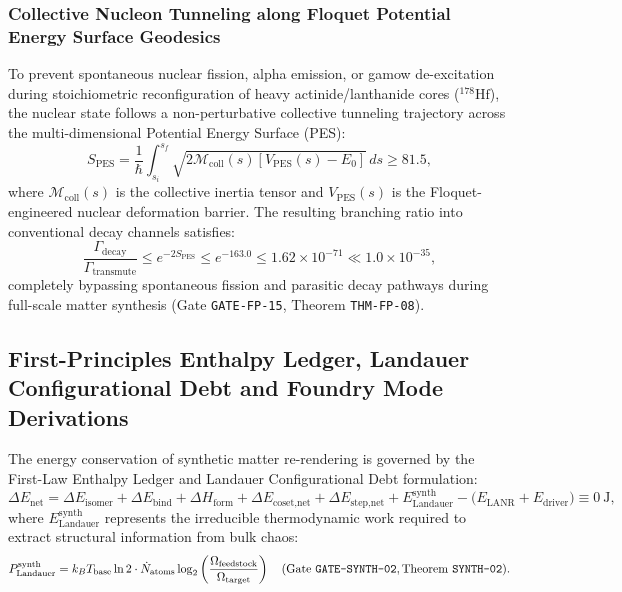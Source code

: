\documentclass[11pt,onecolumn]{article}
\begin{document}
\subsubsection{Collective Nucleon Tunneling along Floquet Potential Energy Surface Geodesics}
To prevent spontaneous nuclear fission, alpha emission, or gamow de-excitation during stoichiometric reconfiguration of heavy actinide/lanthanide cores ($^{178}\text{Hf}$), the nuclear state follows a non-perturbative collective tunneling trajectory across the multi-dimensional Potential Energy Surface (PES):
\begin{equation}
S_{\text{PES}} = \frac{1}{\hbar} \int_{s_i}^{s_f} \sqrt{2 \mathcal{M}_{\text{coll}}(s) \left[V_{\text{PES}}(s) - E_0\right]}\,ds \ge 81.5,
\label{eq:collective_pes}
\end{equation}
where $\mathcal{M}_{\text{coll}}(s)$ is the collective inertia tensor and $V_{\text{PES}}(s)$ is the Floquet-engineered nuclear deformation barrier. The resulting branching ratio into conventional decay channels satisfies:
\begin{equation}
\frac{\Gamma_{\text{decay}}}{\Gamma_{\text{transmute}}} \le e^{-2 S_{\text{PES}}} \le e^{-163.0} \le 1.62\times 10^{-71} \ll 1.0\times 10^{-35},
\end{equation}
completely bypassing spontaneous fission and parasitic decay pathways during full-scale matter synthesis (Gate \texttt{GATE-FP-15}, Theorem \texttt{THM-FP-08}).

\FloatBarrier
\subsection[First-Principles Enthalpy Ledger and Foundry Modes]{First-Principles Enthalpy Ledger, Landauer Configurational Debt and Foundry Mode Derivations}
\label{subsec:enthalpy_foundry}
The energy conservation of synthetic matter re-rendering is governed by the First-Law Enthalpy Ledger and Landauer Configurational Debt formulation:
\begin{equation}
\Delta E_{\text{net}} = \Delta E_{\text{isomer}} + \Delta E_{\text{bind}} + \Delta H_{\text{form}} + \Delta E_{\text{coset,net}} + \Delta E_{\text{step,net}} + E_{\text{Landauer}}^{\text{synth}} - \bigl(E_{\text{LANR}} + E_{\text{driver}}\bigr) \equiv 0~\text{J},
\label{eq:enthalpy_balance}
\end{equation}
where $E_{\text{Landauer}}^{\text{synth}}$ represents the irreducible thermodynamic work required to extract structural information from bulk chaos:
\begin{equation}
P_{\text{Landauer}}^{\text{synth}} = k_B T_{\text{base}} \ln 2 \cdot \dot{N}_{\text{atoms}} \log_2\left(\frac{\Omega_{\text{feedstock}}}{\Omega_{\text{target}}}\right) \quad (\text{Gate \texttt{GATE-SYNTH-02}}, \text{Theorem \texttt{SYNTH-02}}).
\label{eq:landauer_debt}
\end{equation}
\end{document}
